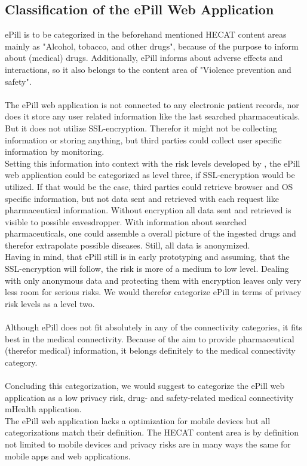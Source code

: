 \subsection{Classification of the ePill Web Application}
ePill is to be categorized in the beforehand mentioned HECAT content areas mainly as "Alcohol, tobacco, and other drugs", because of the purpose to inform about (medical) drugs. Additionally, ePill informs about adverse effects and interactions, so it also belongs to the content area of "Violence prevention and safety".
\\
\\
The ePill web application is not connected to any electronic patient records, nor does it store any user related information like the last searched pharmaceuticals. But it does not utilize SSL-encryption. Therefor it might not be collecting information or storing anything, but third parties could collect user specific information by monitoring.
\\
Setting this information into context with the risk levels developed by \cite{Njie.2013}, the ePill web application could be categorized as level three, if SSL-encryption would be utilized. If that would be the case, third parties could retrieve browser and OS specific information, but not data sent and retrieved with each request like pharmaceutical information. Without encryption all data sent and retrieved is visible to possible eavesdropper. With information about searched pharmaceuticals, one could assemble a overall picture of the ingested drugs and therefor extrapolate possible diseases. Still, all data is anonymized.
\\
Having in mind, that ePill still is in early prototyping and assuming, that the SSL-encryption will follow, the risk is more of a medium to low level. Dealing with only anonymous data and protecting them with encryption leaves only very less room for serious risks. We would therefor categorize ePill in terms of privacy risk levels as a level two.
\\
\\
Although ePill does not fit absolutely in any of the connectivity categories, it fits best in the medical connectivity. Because of the aim to provide pharmaceutical (therefor medical) information, it belongs definitely to the medical connectivity category.
\\
\\
Concluding this categorization, we would suggest to categorize the ePill web application as a low privacy risk, drug- and safety-related medical connectivity mHealth application.
\\
The ePill web application lacks a optimization for mobile devices but all categorizations match their definition. The HECAT content area is by definition not limited to mobile devices and privacy risks are in many ways the same for mobile apps and web applications.

